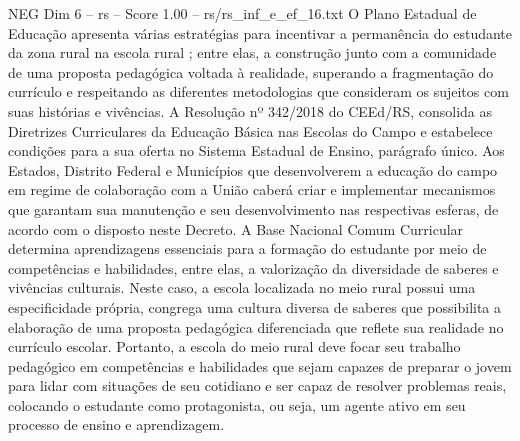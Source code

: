\begin{textsample}{NEG Dim 6 – rs – Score 1.00 – rs/rs\_inf\_e\_ef\_16.txt}
O Plano Estadual de Educação apresenta várias estratégias para incentivar a permanência do estudante da zona rural na escola rural ; entre elas, a construção junto com a comunidade de uma proposta pedagógica voltada à realidade, superando a fragmentação do currículo e respeitando as diferentes metodologias que consideram os sujeitos com suas histórias e vivências.
A Resolução nº 342/2018 do CEEd/RS, consolida as Diretrizes Curriculares da Educação Básica nas Escolas do Campo e estabelece condições para a sua oferta no Sistema Estadual de Ensino, parágrafo único.
Aos Estados, Distrito Federal e Municípios que desenvolverem a educação do campo em regime de colaboração com a União caberá criar e implementar mecanismos que garantam sua manutenção e seu desenvolvimento nas respectivas esferas, de acordo com o disposto neste Decreto.
A Base Nacional Comum Curricular determina aprendizagens essenciais para a formação do estudante por meio de competências e habilidades, entre elas, a valorização da diversidade de saberes e vivências culturais.
Neste caso, a escola localizada no meio rural possui uma especificidade própria, congrega uma cultura diversa de saberes que possibilita a elaboração de uma proposta pedagógica diferenciada que reflete sua realidade no currículo escolar.
Portanto, a escola do meio rural deve focar seu trabalho pedagógico em competências e habilidades que sejam capazes de preparar o jovem para lidar com situações de seu cotidiano e ser capaz de resolver problemas reais, colocando o estudante como protagonista, ou seja, um agente ativo em seu processo de ensino e aprendizagem.

\end{textsample}
